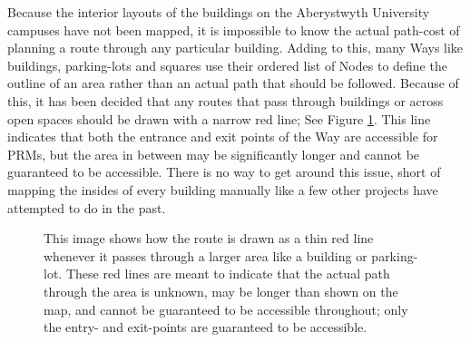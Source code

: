 Because the interior layouts of the buildings on the Aberystwyth University campuses have not been mapped, it is impossible to know the actual path-cost of planning a route through any particular building. Adding to this, many Ways like buildings, parking-lots and squares use their ordered list of Nodes to define the outline of an area rather than an actual path that should be followed. Because of this, it has been decided that any routes that pass through buildings or across open spaces should be drawn with a narrow red line; See Figure \ref{fig:areaPath}. This line indicates that both the entrance and exit points of the Way are accessible for PRMs, but the area in between may be significantly longer and cannot be guaranteed to be accessible. There is no way to get around this issue, short of mapping the insides of every building manually like a few other projects have attempted to do in the past\cite{osm_research-projects}.

\begin{figure}[hb]
	\centering
	\label{fig:areaPath}
	\caption[Red path through areas]{This image shows how the route is drawn as a thin red line whenever it passes through a larger area like a building or parking-lot. These red lines are meant to indicate that the actual path through the area is unknown, may be longer than shown on the map, and cannot be guaranteed to be accessible throughout; only the entry- and exit-points are guaranteed to be accessible.}
\end{figure}


